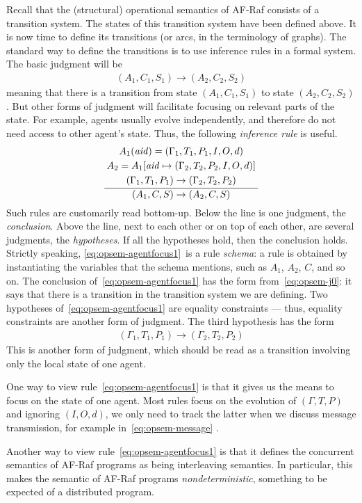 \documentclass[a4paper,12pt,oneside,fleqn]{book} %
\newcommand{\on}[2]{\genfrac{}{}{0pt}{0}{\strut#1}{\strut#2}}
\begin{document}
{Recall that the (structural) operational semantics of AF-Raf consists of a
transition system. The states of this transition system have been defined
above. It is now time to define its transitions (or arcs, in the
terminology of graphs). The standard way to define the transitions is to
use inference rules in a formal system. The basic judgment will be
\begin{align}
(A_1,C_1,S_1) \to (A_2, C_2,S_2)
\label{eq:opsem-j0}
\end{align}
meaning that there is a transition from state $(A_1,C_1,S_1)$ to state
$(A_2,C_2,S_2)$. But other forms of judgment will facilitate focusing on
relevant parts of the state. For example, agents usually evolve
independently, and therefore do not need access to other agent's state.
Thus, the following \emph{inference rule} is useful.
\begin{align}
\frac
  {\on{A_1({\it aid})=(\Gamma_1,T_1,P_1,I,O,d)}
  {\on{A_2=A_1[{\it aid}\mapsto(\Gamma_2,T_2,P_2,I,O,d)]}
  {(\Gamma_1,T_1,P_1)\to(\Gamma_2,T_2,P_2)}}}
  {(A_1,C,S)\to(A_2,C,S)}
\label{eq:opsem-agentfocus1}
\end{align}
Such rules are customarily read bottom-up. Below the line is one judgment,
the \emph{conclusion}. Above the line, next to each other or on top of each
other, are several judgments, the \emph{hypotheses}. If all the hypotheses
hold, then the conclusion holds. Strictly speaking,
\eqref{eq:opsem-agentfocus1}~is a rule \emph{schema}: a rule is obtained by
instantiating the variables that the schema mentions, such as $A_1$, $A_2$,
$C$, and so on. The conclusion of~\eqref{eq:opsem-agentfocus1} has the form
from~\eqref{eq:opsem-j0}: it says that there is a transition in the
transition system we are defining. Two hypotheses
of~\eqref{eq:opsem-agentfocus1} are equality constraints --- thus, equality
constraints are another form of judgment. The third hypothesis has the form
\begin{align}
(\Gamma_1,T_1,P_1)\to(\Gamma_2,T_2,P_2)
\end{align}
This is another form of judgment, which should be read as a transition
involving only the local state of one agent. 

One way to view rule~\eqref{eq:opsem-agentfocus1} is that it gives us the
means to focus on the state of one agent. Most rules focus on the evolution
of $(\Gamma,T,P)$ and ignoring $(I,O,d)$, we only need to track the latter
when we discuss message transmission, for example in~\eqref{eq:opsem-message} .

Another way to view rule~\eqref{eq:opsem-agentfocus1} is that it defines the
concurrent semantics of AF-Raf programs as being interleaving semantics. In
particular, this makes the semantic of AF-Raf programs
\emph{nondeterministic}, something to be expected of a distributed program.

}
\end{document}
